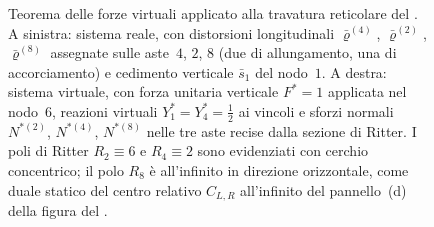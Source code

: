 \begin{esempio}
\begin{svolgimento}
\begin{figure}[htbp]
{%
			}
			\caption{Teorema delle forze virtuali applicato alla travatura
				reticolare del . A sinistra: sistema
				reale, con distorsioni longitudinali $\bar\varrho^{(4)}$, $\bar\varrho^{(2)}$,
				$\bar\varrho^{(8)}$ assegnate sulle aste~$4$, $2$, $8$ (due di
				allungamento, una di accorciamento) e cedimento verticale $\bar s_1$
				del nodo~$1$. A destra: sistema virtuale, con forza unitaria verticale
				$F^{*}=1$ applicata nel nodo~$6$, reazioni virtuali $Y_1^{*}=Y_4^{*}
				=\tfrac{1}{2}$ ai vincoli e sforzi normali $N^{*(2)}$, $N^{*(4)}$,
				$N^{*(8)}$ nelle tre aste recise dalla sezione di Ritter.
				I poli di Ritter $R_2\equiv 6$ e $R_4\equiv 2$ sono evidenziati con
				cerchio concentrico; il polo $R_8$ è all'infinito in direzione
				orizzontale, come duale statico del centro relativo $C_{L,R}$
				all'infinito del pannello~(d) della figura del
				.}
			\label{fig:TFV_reticolare}
		\end{figure}
		

\end{svolgimento}
\end{esempio}
